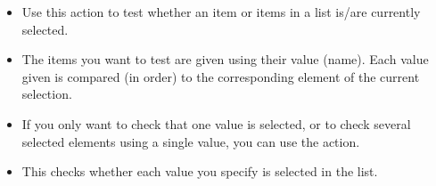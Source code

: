 \begin{itemize}
\item Use this action to test whether an item or items in a list is/are currently selected. 
\item The items you want to test are given using their value (name). Each value given is compared (in order) to the corresponding element of the current selection.
\item If you only want to check that one value is selected, or to check several selected elements using a single value, you can  use the  action. 
\item This checks whether each value you specify is selected in the list. 
\end{itemize}
